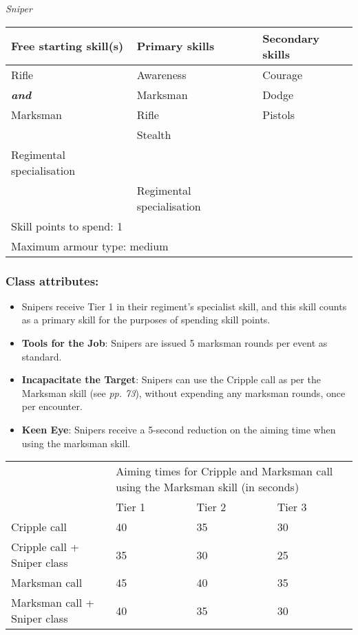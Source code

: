\textit{Sniper}

\begin{table}[H]
\begin{tabular}{|l|l|l|} \hline 
Free starting skill(s) & Primary skills & Secondary skills \\
 \hline Rifle & Awareness & Courage \\
 \hline \textbf{\textit{and}} & Marksman & Dodge \\
 \hline Marksman & Rifle & Pistols \\
 \hline  & Stealth &  \\
 \hline Regimental specialisation &  &  \\
 \hline  & Regimental specialisation &  \\
 \hline \multicolumn{3}{|l|}{Skill points to spend: 1} \\
 \hline \multicolumn{3}{|l|}{Maximum armour type: medium} \\
 \hline \end{tabular}

\end{table}

\subsubsection{Class attributes:}

\begin{itemize}
\item Snipers receive Tier 1 in their regiment's specialist skill, and this skill counts as a primary skill for the purposes of spending skill points.

\item \textbf{Tools for the Job}: Snipers are issued 5 marksman rounds per event as standard.

\item \textbf{Incapacitate the Target}: Snipers can use the Cripple call as per the Marksman skill (see \textit{pp. 73}), without expending any marksman rounds, once per encounter.

\item \textbf{Keen Eye}: Snipers receive a 5-second reduction on the aiming time when using the marksman skill.

\end{itemize}

\begin{table}[H]
\begin{tabular}{|l|l|l|l|} \hline 
\multirow{1}{*}{}& \multicolumn{3}{|l|}{Aiming times for Cripple and Marksman call using the Marksman skill (in seconds)} \\
\cline{2-2}\cline{3-3}\cline{4-4} & Tier 1 & Tier 2 & Tier 3 \\
 \hline Cripple call & 40 & 35 & 30 \\
 \hline Cripple call + Sniper class & 35 & 30 & 25 \\
 \hline Marksman call & 45 & 40 & 35 \\
 \hline Marksman call + Sniper class & 40 & 35 & 30 \\
 \hline \end{tabular}

\end{table}

